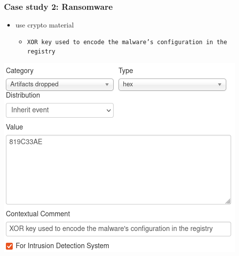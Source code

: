 \begin{frame}
    \frametitle{Case study 2: Ransomware}
    \begin{itemize}
        \item use crypto material
        \begin{itemize}
            \item \texttt{XOR key used to encode the malware's configuration in the registry}
        \end{itemize}
    \end{itemize}
    \begin{center}
        \includegraphics[width=0.47\linewidth]{pictures/case2/attribute-key.png}
    \end{center}
\end{frame}


